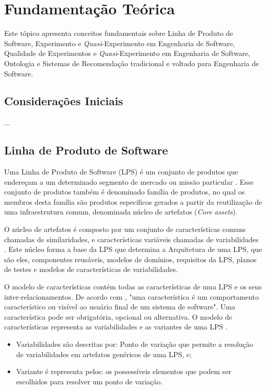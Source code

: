 \chapter{Fundamentação Teórica}
\label{sec:revisao}

Este tópico apresenta conceitos fundamentais sobre Linha de Produto de Software, Experimento e \textit{Quasi}-Experimento em Engenharia de Software, Qualidade de Experimentos e \textit{Quasi}-Experimento em Engenharia de Software, Ontologia e Sistemas de Recomendação tradicional e voltado para Engenharia de Software.

\section{Considerações Iniciais}
\label{sec:concidaracoes_iniciais}

...

\section{Linha de Produto de Software}
\label{sec:lin_prod_software}

Uma Linha de Produto de Software (LPS) é um conjunto de produtos que endereçam a um determinado segmento de mercado ou missão particular \cite{northrop2007framework}. Esse conjunto de produtos também é denominado família de produtos, no qual os membros desta família são produtos específicos gerados a partir da reutilização de uma infraestrutura comum, denominada núcleo de artefatos (\textit{Core assets}). 

O núcleo de artefatos é composto por um conjunto de características comuns chamadas de similaridades, e características variáveis chamadas de variabilidades \cite{van2007product}. Este núcleo forma a base da LPS que determina a Arquitetura de uma LPS, que são eles, componentes reusáveis, modelos de domínios, requisitos da LPS, planos de testes e modelos de características de variabilidades.

O modelo de características contém todas as características de uma LPS e os seus inter-relacionamentos. De acordo com \citeauthor{apel2013analytic}, "uma característica é um comportamento característico ou visível ao usuário final de um sistema de software". Uma característica pode ser obrigatória, opcional ou alternativa. O modelo de características representa as variabilidades e as variantes de uma LPS \cite{apel2013analytic}.

\begin{itemize}
	\item Variabilidades são descritas por: Ponto de variação que permite a resolução de variabilidades em artefatos genéricos de uma LPS, e; 
	\item Variante é representa pelos: os possessíveis elementos que podem ser escolhidos para resolver um ponto de variação.
\end{itemize}

